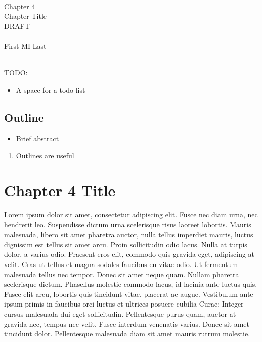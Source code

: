 \documentclass[draftthesis,fullpage,offcenter]{uiucthesis2009}
\begin{document}
	
	\setcounter{chapter}{3}
	\mainmatter
	
	\begin{center}
	~\\~\\~\\
		{\Large Chapter 4\\}
		{\LARGE Chapter Title\\}
		{\Huge DRAFT\\}~\\
		{\Large First MI Last\\}
	\end{center}
	~\\
	{\Large TODO:}
	\begin{itemize}
		\item A space for a todo list
	\end{itemize}

	\thispagestyle{empty}
	\newpage
	
	\section*{Outline}
	
	\begin{itemize}
		\item Brief abstract
	\end{itemize}
	\begin{enumerate}
		\item Outlines are useful
	\end{enumerate}
	
	\thispagestyle{empty}
	\setcounter{page}{\pageref{ch3:end}}
	\newpage
\else
\fi

\newcommand{\aside}[1]{{\color{red} [#1]}}

\graphicspath{{./fig_ch4/}}


\chapter{Chapter 4 Title}\label{ch:chapter4_label}

Lorem ipsum dolor sit amet, consectetur adipiscing elit. Fusce nec diam urna, 
nec hendrerit leo. Suspendisse dictum urna scelerisque risus laoreet lobortis. 
Mauris malesuada, libero sit amet pharetra auctor, nulla tellus imperdiet 
mauris, luctus dignissim est tellus sit amet arcu. Proin sollicitudin odio 
lacus. Nulla at turpis dolor, a varius odio. Praesent eros elit, commodo quis 
gravida eget, adipiscing at velit. Cras ut tellus et magna sodales faucibus eu 
vitae odio. Ut fermentum malesuada tellus nec tempor. Donec sit amet neque quam. 
Nullam pharetra scelerisque dictum. Phasellus molestie commodo lacus, id lacinia 
ante luctus quis. Fusce elit arcu, lobortis quis tincidunt vitae, placerat ac 
augue. Vestibulum ante ipsum primis in faucibus orci luctus et ultrices posuere 
cubilia Curae; Integer cursus malesuada dui eget sollicitudin. Pellentesque 
purus quam, auctor at gravida nec, tempus nec velit. Fusce interdum venenatis 
varius. Donec sit amet tincidunt dolor. Pellentesque malesuada diam sit amet 
mauris rutrum molestie.
\end{document}
